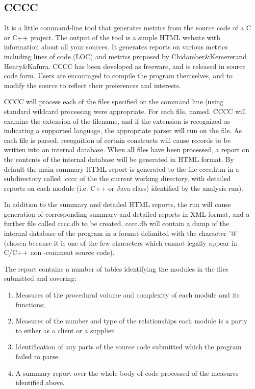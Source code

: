 \subsection{CCCC}

It is a little command-line tool that generates metrics from the source code of a C or C++ project. The output of the tool is a simple HTML website with information about all your sources. It generates reports on various metrics including lines of code (LOC) and metrics proposed by Chidamber\&Kemererand Henry\&Kafura. CCCC has been developed as freeware, and is released in source code form. Users are encouraged to compile the program themselves, and to modify the source to reflect their preferences and interests.

CCCC will process each of the files specified on the command line (using standard wildcard processing were appropriate. For each file, named, CCCC will examine the extension of the filename, and if the extension is recognized as indicating a supported language, the appropriate parser will run on the file. As each file is parsed, recognition of certain constructs will cause records to be written into an internal database. When all files have been processed, a report on the contents of the internal database
will be generated in HTML format. By default the main summary HTML report is generated to the file cccc.htm in a subdirectory called .cccc of the the current working directory, with detailed reports on each module (i.e. C++ or Java class) identified by the analysis run).

In addition to the summary and detailed HTML reports, the run will cause generation of corresponding summary and detailed reports in XML format, and a further file called cccc.db to be created. cccc.db will contain a dump of the internal database of the program in a format delimited with the character '@' (chosen because it is one of the few characters which cannot legally appear in C/C++ non -comment source code).

The report contains a number of tables identifying the modules in the files submitted and covering:
\begin{enumerate}
	\item Measures of the procedural volume and complexity of each module and its functions;. 
	\item Measures of the number and type of the relationships each module is a party to either as a client or a supplier.
	\item Identification of any parts of the source code submitted which the program failed to parse.
	\item A summary report over the whole body of code processed of the measures identified above.
\end{enumerate}


